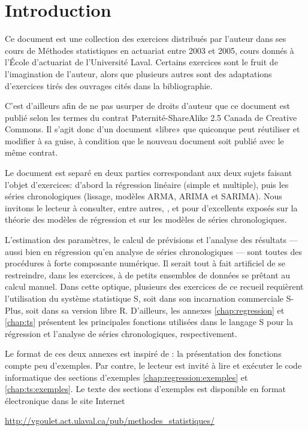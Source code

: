 \chapter*{Introduction}


Ce document est une collection des exercices distribués par l'auteur
dans ses cours de Méthodes statistiques en actuariat entre 2003 et
2005, cours donnés à l'École d'actuariat de l'Université Laval.
Certains exercices sont le fruit de l'imagination de l'auteur, alors
que plusieurs autres sont des adaptations d'exercices tirés des
ouvrages cités dans la bibliographie.

C'est d'ailleurs afin de ne pas usurper de droits d'auteur que ce
document est publié selon les termes du contrat Paternité-ShareAlike
2.5 Canada de Creative Commons. Il s'agit donc d'un document «libre»
que quiconque peut réutiliser et modifier à sa guise, à condition que
le nouveau document soit publié avec le même contrat.

Le document est separé en deux parties correspondant aux deux sujets
faisant l'objet d'exercices: d'abord la régression linéaire (simple et
multiple), puis les séries chronologiques (lissage, modèles ARMA,
ARIMA et SARIMA). Nous invitons le lecteur à consulter, entre autres,
\citet{AbrahamLedolter}, \citet{DraperSmith} et \citet{BrockwellDavis}
pour d'excellents exposés sur la théorie des modèles de régression et
sur les modèles de séries chronologiques.

L'estimation des paramètres, le calcul de prévisions et l'analyse des
résultats --- aussi bien en régression qu'en analyse de séries
chronologiques --- sont toutes des procédures à forte composante
numérique. Il serait tout à fait artificiel de se restreindre, dans
les exercices, à de petits ensembles de données se prêtant au calcul
manuel. Dans cette optique, plusieurs des exercices de ce recueil
requièrent l'utilisation du système statistique S, soit dans son
incarnation commerciale S-Plus, soit dans sa version libre \textsf{R}.
D'ailleurs, les annexes \ref{chap:regression} et \ref{chap:ts}
présentent les principales fonctions utilisées dans le langage S pour
la régression et l'analyse de séries chronologiques, respectivement.

Le format de ces deux annexes est inspiré de \citet{Goulet_intro_S}:
la présentation des fonctions compte peu d'exemples. Par contre, le
lecteur est invité à lire et exécuter le code informatique des
sections d'exemples \ref{chap:regression:exemples} et
\ref{chap:ts:exemples}.  Le texte des sections d'exemples est
disponible en format électronique dans le site Internet
\begin{center}
  \url{http://vgoulet.act.ulaval.ca/pub/methodes_statistiques/}
\end{center}

